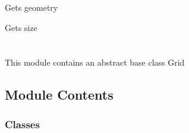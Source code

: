 \documentclass[letterpaper,10pt,english]{sphinxmanual}
\begin{document}
\begin{fulllineitems}
\begin{fulllineitems}
\end{fulllineitems}


\begin{fulllineitems}
\label{\detokenize{autoapi/AirfoilMap/index:AirfoilMap.AirfoilMap.get_geometry}}
\sphinxAtStartPar
Gets geometry

\end{fulllineitems}


\begin{fulllineitems}
\label{\detokenize{autoapi/AirfoilMap/index:AirfoilMap.AirfoilMap.get_size}}
\sphinxAtStartPar
Gets size

\end{fulllineitems}


\end{fulllineitems}



\section{}
\label{\detokenize{autoapi/BoundaryConditioner/index:module-BoundaryConditioner}}\label{\detokenize{autoapi/BoundaryConditioner/index:boundaryconditioner}}\label{\detokenize{autoapi/BoundaryConditioner/index::doc}}
\sphinxAtStartPar
This module contains an abstract base class Grid


\subsection{Module Contents}
\label{\detokenize{autoapi/BoundaryConditioner/index:module-contents}}

\subsubsection{Classes}
\label{\detokenize{autoapi/BoundaryConditioner/index:classes}}
\end{document}
